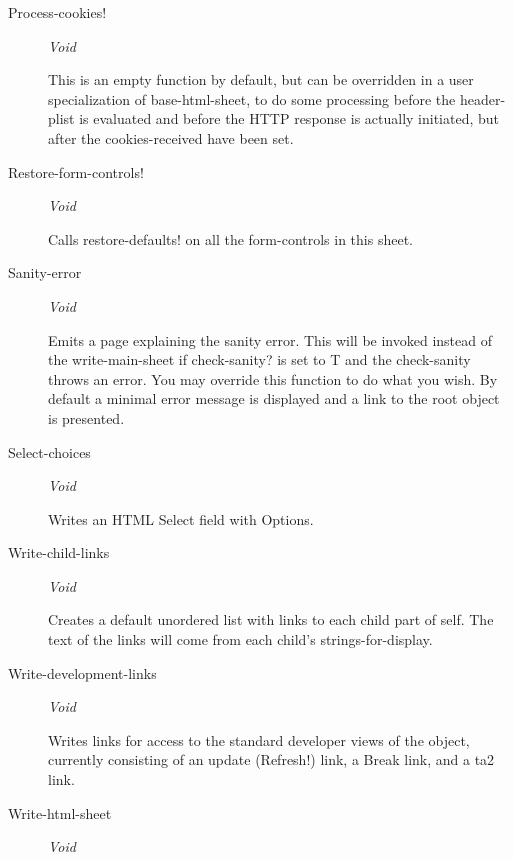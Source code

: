 \documentclass [11pt]{book}
\begin{document}
\begin{itemize}
\begin{description}
\item [Process-cookies!]
\emph{Void}

 This is an empty function by default, but can be overridden in
a user specialization of base-html-sheet, to do some processing before the
header-plist is evaluated and before the HTTP response is actually initiated, but after
the cookies-received have been set.




\item [Restore-form-controls!]
\emph{Void}

 Calls restore-defaults! on all the form-controls in this sheet.




\item [Sanity-error]
\emph{Void}

 Emits a page explaining the sanity error. This will be invoked instead of the write-main-sheet
if check-sanity? is set to T and the check-sanity throws an error. You may override this function to
do what you wish. By default a minimal error message is displayed and a link to the root object
is presented.




\item [Select-choices]
\emph{Void}

 Writes an HTML Select field with Options.




\item [Write-child-links]
\emph{Void}

 Creates a default unordered list with links to each child part of self.
The text of the links will come from each child's strings-for-display.




\item [Write-development-links]
\emph{Void}

 Writes links for access to the standard developer views of the object, currently consisting
of an update (Refresh!) link, a Break link, and a ta2 link.




\item [Write-html-sheet]
\emph{Void}


\end{description}
\end{itemize}
\end{document}
